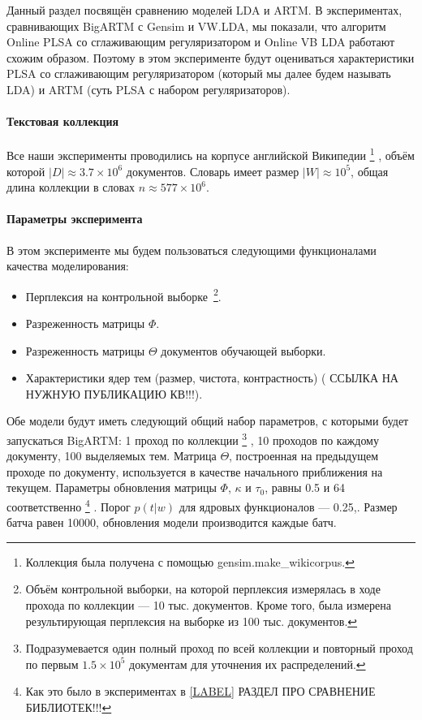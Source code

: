 \documentclass{article}
\begin{document}
Данный раздел посвящён сравнению моделей LDA и ARTM. В экспериментах, сравнивающих BigARTM с Gensim и VW.LDA, мы показали, что алгоритм Online PLSA со сглаживающим регуляризатором и Online VB LDA работают схожим образом. Поэтому в этом эксперименте будут оцениваться характеристики PLSA со сглаживающим регуляризатором (который мы далее будем называть LDA) и ARTM (суть PLSA с набором регуляризаторов).

\paragraph{Текстовая коллекция} Все наши эксперименты проводились на корпусе английской Википедии
\footnote{Коллекция была получена с помощью gensim.make\_wikicorpus.}
, объём которой $|D| \approx 3.7 \times 10^6$ документов. Словарь имеет размер $|W| \approx 10^5$, общая длина коллекции в словах $n \approx 577 \times 10^6$.

\paragraph{Параметры эксперимента}
В этом эксперименте мы будем пользоваться следующими функционалами качества моделирования:
\begin{itemize}
	\item Перплексия на контрольной выборке\
	\footnote{Объём контрольной выборки, на которой перплексия измерялась в ходе прохода по коллекции --- 10 тыс. документов. Кроме того, была измерена результирующая перплексия на выборке из 100 тыс. документов.}.
	\item Разреженность матрицы $\Phi$.
	\item Разреженность матрицы $\Theta$ документов обучающей выборки.
	\item Характеристики ядер тем (размер, чистота, контрастность) (\cite{LABEL} ССЫЛКА НА НУЖНУЮ ПУБЛИКАЦИЮ КВ!!!).
\end{itemize}
Обе модели будут иметь следующий общий набор параметров, с которыми будет запускаться BigARTM: 1 проход по коллекции
\footnote{Подразумевается один полный проход по всей коллекции и повторный проход по первым $1.5 \times 10^5$ документам для уточнения их распределений.}
, 10 проходов по каждому документу, 100 выделяемых тем. Матрица $\Theta$, построенная на предыдущем проходе по документу, используется в качестве начального приближения на текущем. Параметры обновления матрицы $\Phi$, $\kappa$ и $\tau_0$, равны 0.5 и 64 соответственно
\footnote{Как это было в экспериментах в \ref{LABEL} РАЗДЕЛ ПРО СРАВНЕНИЕ БИБЛИОТЕК!!!}
. Порог $p(t|w)$ для ядровых функционалов --- 0.25,. Размер батча равен 10000, обновления модели производится каждые батч.
\end{document}
